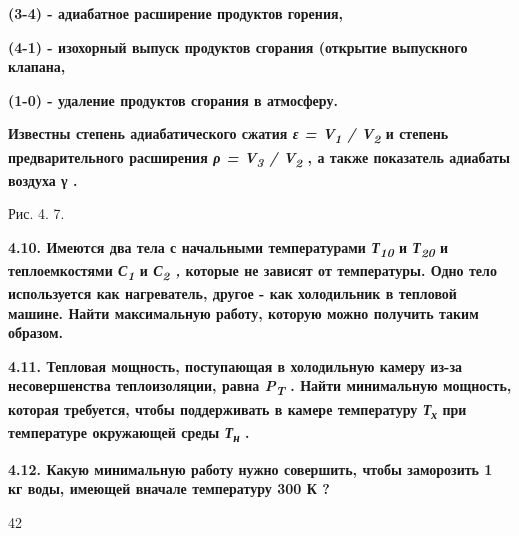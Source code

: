 \textbf{(3-4) - адиабатное расширение продуктов горения,}

\textbf{(4-1) - изохорный выпуск продуктов сгорания (открытие выпускного
клапана,}

\textbf{(1-0) - удаление продуктов сгорания в атмосферу.}

\textbf{Известны степень адиабатического сжатия \emph{ε =
V\textsubscript{1} / V\textsubscript{2}} и степень предварительного
расширения \emph{ρ = V\textsubscript{3} / V\textsubscript{2}} , а также
показатель адиабаты воздуха γ .}

\begin{quote}
\end{quote}

Рис. 4. 7.

\textbf{4.10. Имеются два тела с начальными температурами
\emph{Т\textsubscript{10}} и \emph{Т\textsubscript{20}} и теплоемкостями
\emph{С\textsubscript{1}} и \emph{С\textsubscript{2} ,} которые не
зависят от температуры. Одно тело используется как нагреватель, другое -
как холодильник в тепловой машине. Найти максимальную работу, которую
можно получить таким образом.}

\textbf{4.11. Тепловая мощность, поступающая в холодильную камеру из-за
несовершенства теплоизоляции, равна \emph{P\textsubscript{T}} . Найти
минимальную мощность, которая требуется, чтобы поддерживать в камере
температуру \emph{Т\textsubscript{х}} при температуре окружающей среды
\emph{Т\textsubscript{н}} .}

\textbf{4.12. Какую минимальную работу нужно совершить, чтобы заморозить
1 кг воды, имеющей вначале температуру 300 К ?}

42